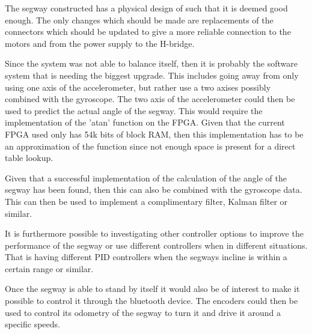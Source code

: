 The segway constructed has a physical design of such that it is deemed good enough.
The only changes which should be made are replacements of the connectors which should be updated to give a more reliable connection to the motors and from the power supply to the H-bridge.

Since the system was not able to balance itself, then it is probably the software system that is needing the biggest upgrade.
This includes going away from only using one axis of the accelerometer, but rather use a two axises possibly combined with the gyroscope.
The two axis of the accelerometer could then be used to predict the actual angle of the segway.
This would require the implementation of the 'atan' function on the FPGA.
Given that the current FPGA used only has 54k bits of block RAM, then this implementation has to be an approximation of the function since not enough space is present for a direct table lookup.

Given that a successful implementation of the calculation of the angle of the segway has been found, then this can also be combined with the gyroscope data.
This can then be used to implement a complimentary filter, Kalman filter or similar.

It is furthermore possible to investigating other controller options to improve the performance of the segway or use different controllers when in different situations.
That is having different PID controllers when the segways incline is within a certain range or similar.

Once the segway is able to stand by itself it would also be of interest to make it possible to control it through the bluetooth device.
The encoders could then be used to control its odometry of the segway to turn it and drive it around a specific speeds.